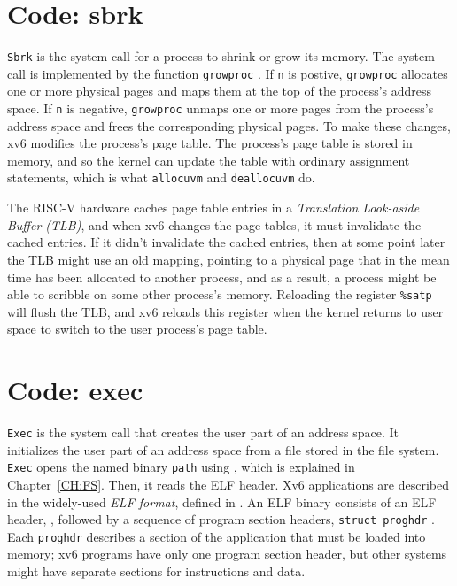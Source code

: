 \section{Code: sbrk}
\lstinline{Sbrk}
is the system call for a process to shrink or grow its memory. The system
call is implemented by the function
\lstinline{growproc}
.
If
\lstinline{n}
is postive,
\lstinline{growproc}
allocates one or more physical pages and maps them at the top of the process's
address space.  If
\lstinline{n}
is negative,
\lstinline{growproc}
unmaps one or more pages from the process's address space and frees the corresponding
physical pages.
To make these changes,
xv6 modifies the process's page table.  The process's page table is stored in
memory, and so the kernel can update the table with ordinary assignment
statements, which is what
\lstinline{allocuvm}
and
\lstinline{deallocuvm}
do.

The RISC-V hardware caches page table entries in a
\textit{Translation Look-aside Buffer (TLB)},
and when xv6 changes the page tables, it must invalidate the cached entries.  If
it didn't invalidate the cached entries, then at some point later the TLB might
use an old mapping, pointing to a physical page that in the mean time has been
allocated to another process, and as a result, a process might be able to
scribble on some other process's memory.  Reloading the register
\texttt{\%satp}
will flush the TLB, and xv6 reloads this register
when the kernel returns to user space to switch to the user process's
page table.
\section{Code: exec}
\lstinline{Exec}
is the system call that creates the user part of an address space.  It
initializes the user part of an address space from a file stored in the file
system.
\lstinline{Exec}
opens the named binary
\lstinline{path}
using
,
which is explained in Chapter~\ref{CH:FS}.
Then, it reads the ELF header. Xv6 applications are described in the widely-used
\textit{ELF format},
defined in
.
An ELF binary consists of an ELF header,
,
followed by a sequence of program section headers,
\lstinline{struct proghdr}
.
Each
\lstinline{proghdr}
describes a section of the application that must be loaded into memory;
xv6 programs have only one program section header, but
other systems might have separate sections
for instructions and data.

